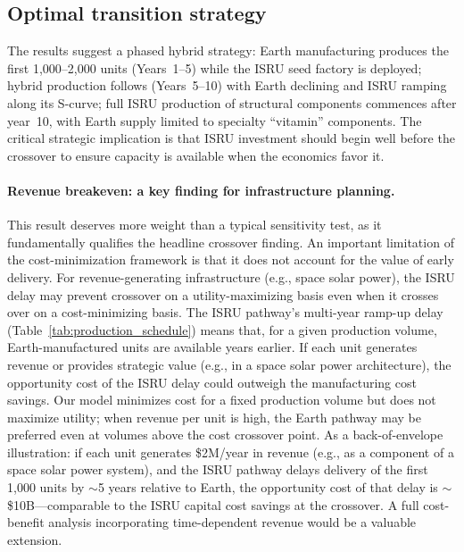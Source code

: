 \documentclass[preprint,12pt]{elsarticle}
\begin{document}
\subsection{Optimal transition strategy}

The results suggest a phased hybrid strategy: Earth manufacturing produces the first 1{,}000--2{,}000 units (Years~1--5) while the ISRU seed factory is deployed; hybrid production follows (Years~5--10) with Earth declining and ISRU ramping along its S-curve; full ISRU production of structural components commences after year~10, with Earth supply limited to specialty ``vitamin'' components. The critical strategic implication is that ISRU investment should begin well before the crossover to ensure capacity is available when the economics favor it.

\paragraph{Revenue breakeven: a key finding for infrastructure planning.} This result deserves more weight than a typical sensitivity test, as it fundamentally qualifies the headline crossover finding. An important limitation of the cost-minimization framework is that it does not account for the value of early delivery. For revenue-generating infrastructure (e.g., space solar power), the ISRU delay may prevent crossover on a utility-maximizing basis even when it crosses over on a cost-minimizing basis. The ISRU pathway's multi-year ramp-up delay (Table~\ref{tab:production_schedule}) means that, for a given production volume, Earth-manufactured units are available years earlier. If each unit generates revenue or provides strategic value (e.g., in a space solar power architecture), the opportunity cost of the ISRU delay could outweigh the manufacturing cost savings. Our model minimizes cost for a fixed production volume but does not maximize utility; when revenue per unit is high, the Earth pathway may be preferred even at volumes above the cost crossover point. As a back-of-envelope illustration: if each unit generates \$2M/year in revenue (e.g., as a component of a space solar power system), and the ISRU pathway delays delivery of the first 1{,}000 units by $\sim$5 years relative to Earth, the opportunity cost of that delay is $\sim$\$10B---comparable to the ISRU capital cost savings at the crossover. A full cost-benefit analysis incorporating time-dependent revenue would be a valuable extension.
\end{document}
